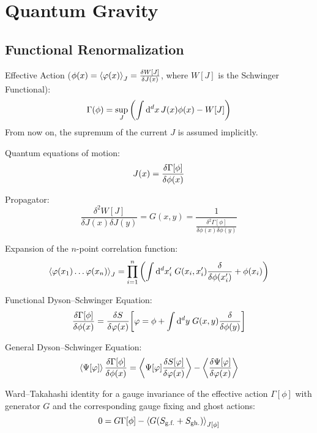 \section{Quantum Gravity}
	\subsection{Functional Renormalization}
		Effective Action ($\phi(x) = \Avg{\varphi(x)}_J = \fdv{W\qty[J]}{J(x)}$, where $W[J]$ is the Schwinger Functional):
		\begin{equation}
			\Gamma(\phi) = \sup_{J} \qty( \int \dd^d x \, J(x) \phi(x) - W[J])
		\end{equation}
		From now on, the supremum of the current $J$ is assumed implicitly.

		\noindent
		Quantum equations of motion:
		\begin{equation}
			J(x)=\fdv{\Gamma\qty[\phi]}{\phi(x)}
		\end{equation}

		\noindent
		Propagator:
		\begin{equation}
			\frac{\delta^2 W[J]}{\delta J(x) \delta J(y)} = G(x,y) = \frac{1}{\frac{\delta^2\Gamma[\phi]}{\delta \phi(x) \delta \phi(y)}}
		\end{equation}

		\noindent
		Expansion of the $n$-point correlation function:
		\begin{equation}
			\Avg{\varphi(x_1) \hdots\varphi(x_n)}_J = \prod_{i=1}^{n} \qty(\int \dd^d x'_i \;G(x_i,x'_i) \fdv{\phi(x'_i)} + \phi(x_i))
		\end{equation}

		\noindent
		Functional Dyson--Schwinger Equation:
		\begin{equation}
			\fdv{\Gamma[\phi]}{\phi(x)} = \fdv{S}{\varphi(x)}\qty[\varphi = \phi + \int \dd^d y\; G(x,y) \fdv{}{\phi(y)}]
		\end{equation}

		\noindent
		General Dyson--Schwinger Equation:
		\begin{equation}
			\Avg{\Psi[\varphi]} \fdv{\Gamma[\phi]}{\phi(x)} = \Avg{\Psi[\varphi] \fdv{S[\varphi]}{\varphi(x)}} - \Avg{\fdv{\Psi[\varphi]}{\varphi(x)}}
		\end{equation}

		\noindent
		Ward--Takahashi identity for a gauge invariance of the effective action $\Gamma[\phi]$ with generator $G$ and the corresponding gauge fixing and ghost actions:
		\begin{equation}
			0 = G \Gamma[\phi] - \left\langle G(S_\text{g.f.} + S_\text{gh.}) \right\rangle_{J[\phi]}
		\end{equation}

